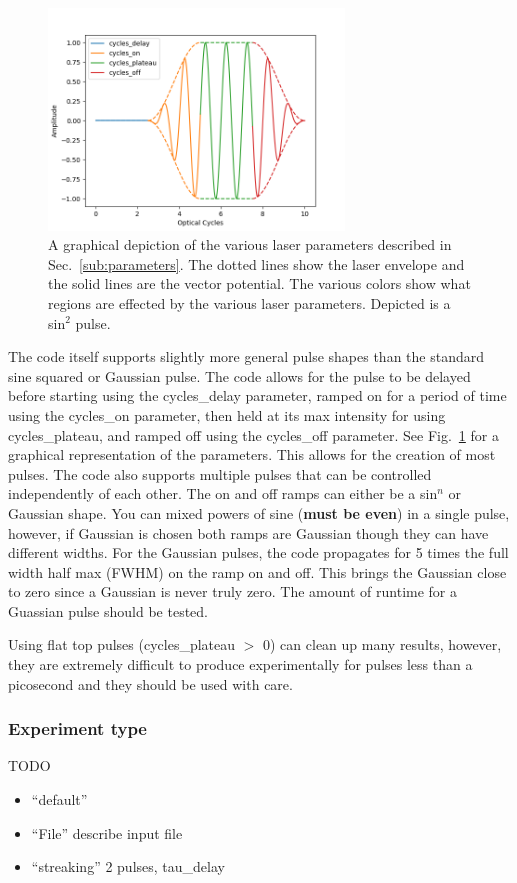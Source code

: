 \documentclass{article}
\begin{document}
\begin{figure}[t]
\centering
\includegraphics[width=0.7\textwidth]{Pulse.png}
\caption{A graphical depiction of the various laser parameters described in Sec.~\ref{sub:parameters}. The dotted lines show the laser envelope and the solid lines are the vector potential. The various colors show what regions are effected by the various laser parameters. Depicted is a sin$^2$ pulse.}
\label{fig:pulse}
\end{figure}

The code itself supports slightly more general pulse shapes than the standard sine squared or Gaussian pulse. The code allows for the pulse to be delayed before starting using the cycles\_delay parameter, ramped on for a period of time using the cycles\_on parameter, then held at its max intensity for using cycles\_plateau, and ramped off using the cycles\_off parameter. See Fig.~\ref{fig:pulse} for a graphical representation of the parameters. This allows for the creation of most pulses. The code also supports multiple pulses that can be controlled independently of each other. The on and off ramps can either be a sin$^n$ or Gaussian shape. You can mixed powers of sine (\textbf{must be even}) in a single pulse, however, if Gaussian is chosen both ramps are Gaussian though they can have different widths. For the Gaussian pulses, the code propagates for 5 times the full width half max (FWHM) on the ramp on and off. This brings the Gaussian close to zero since a Gaussian is never truly zero. The amount of runtime for a Guassian pulse should be tested.

Using flat top pulses (cycles\_plateau $>$ 0) can clean up many results, however, they are extremely difficult to produce experimentally for pulses less than a picosecond and they should be used with care.

\subsubsection{Experiment type} %
\label{ssub:experiment_type}
TODO
\begin{itemize}
  \item ``default''
  \item ``File'' describe input file
  \item ``streaking'' 2 pulses, tau\_delay
\end{itemize}
\end{document}
